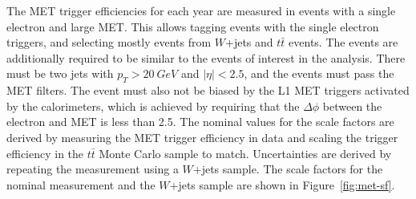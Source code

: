 The MET trigger efficiencies for each year are measured in events with a single electron and large MET.
This allows tagging events with the single electron triggers, and selecting mostly
events from $W$+jets and $t\bar{t}$ events.
The events are additionally required to be similar to the events of interest in the analysis.
There must be two jets with $p_T > \SI{20}{GeV}$ and $|\eta| < 2.5$,
and the events must pass the MET filters.
The event must also not be biased by the L1 MET triggers activated by the calorimeters,
which is achieved by requiring that the $\Delta\phi$ between the electron and MET is
less than 2.5.
The nominal values for the scale factors are derived by measuring
the MET trigger efficiency in data and scaling the trigger efficiency in
the $t\bar{t}$ Monte Carlo sample to match.
Uncertainties are derived by repeating the measurement using a $W$+jets sample.
The scale factors for the nominal measurement and the $W$+jets sample are shown in
Figure~\ref{fig:met-sf}.
